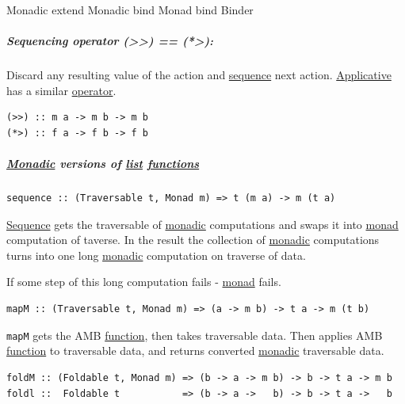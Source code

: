 \documentclass[a4paper,14pt,oneside]{book}
\begin{document}
\label{org80eedac}Monadic extend
\label{org0f58b45}Monadic bind
\label{orgbbca72b}Monad bind
\label{org775400a}Binder

\subsubsubparagraph{(>>=)}
\label{sec:orgf8740b0}

\subsubsubparagraph{>>=}
\label{sec:org0208c66}

\subsubsubparagraph{(=<<)}
\label{sec:org0e6dbfc}

\subsubsubparagraph{=<<}
\label{sec:org3f388f3}

\subparagraph{\label{org4503e08}Sequencing operator (>>) == (*>):}
\label{sec:org7908c04}
Discard any resulting value of the action and \hyperref[orge2b57aa]{sequence} next action.
\hyperref[org805216c]{Applicative} has a similar \hyperref[org015980c]{operator}.
\begin{verbatim}
(>>) :: m a -> m b -> m b
(*>) :: f a -> f b -> f b
\end{verbatim}

\subparagraph{\hyperref[org587c60f]{Monadic} versions of \hyperref[orga17c874]{list} \hyperref[org98c9592]{functions}}
\label{sec:org0acad5e}
\begin{verbatim}
sequence :: (Traversable t, Monad m) => t (m a) -> m (t a)
\end{verbatim}

\hyperref[orge2b57aa]{Sequence} gets the traversable of \hyperref[org587c60f]{monadic} computations and swaps it into \hyperref[org1b8b304]{monad} computation of taverse. In the result the collection of \hyperref[org587c60f]{monadic} computations turns into one long \hyperref[org587c60f]{monadic} computation on traverse of data.

If some step of this long computation fails - \hyperref[org1b8b304]{monad} fails.

\begin{verbatim}
mapM :: (Traversable t, Monad m) => (a -> m b) -> t a -> m (t b)
\end{verbatim}

\texttt{mapM} gets the AMB \hyperref[orgc39a15c]{function}, then takes traversable data. Then applies AMB \hyperref[orgc39a15c]{function} to traversable data, and returns converted \hyperref[org587c60f]{monadic} traversable data.

\begin{verbatim}
foldM :: (Foldable t, Monad m) => (b -> a -> m b) -> b -> t a -> m b
foldl ::  Foldable t           => (b -> a ->   b) -> b -> t a ->   b
\end{verbatim}
\end{document}
